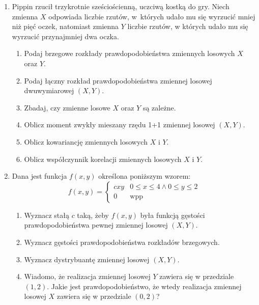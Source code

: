 \documentclass[twoside]{mwart}
\newcommand{\ans}[1]{}
\newenvironment{ansenv}{\comment}{\endcomment}
\newenvironment{ansenv}{\paragraph{Odpowiedź:}}{}
\newcommand{\ans}[1]{\begin{ansenv}#1\end{ansenv}}
\begin{document}
\begin{enumerate}
\item Pippin rzucił trzykrotnie sześciościenną, uczciwą kostką do gry. Niech zmienna $X$ odpowiada liczbie rzutów, w~których udało mu się wyrzucić mniej niż pięć
oczek, natomiast zmienna $Y$ liczbie rzutów, w których udało mu się wyrzucić przynajmniej dwa oczka.
\begin{enumerate}
\item Podaj brzegowe rozkłady prawdopodobieństwa zmiennych losowych $X$ oraz $Y$.
\item Podaj łączny rozkład prawdopodobieństwa zmiennej losowej dwuwymiarowej $(X,Y)$.
\item Zbadaj, czy zmienne losowe $X$ oraz $Y$ są zależne.
\item Oblicz moment zwykły mieszany rzędu 1+1 zmiennej losowej $(X,Y)$.
\item Oblicz kowariancję zmiennych losowych $X$ i $Y$.
\item Oblicz współczynnik korelacji zmiennych losowych $X$ i $Y$.
\end{enumerate}

\item Dana jest funkcja $f(x,y)$ określona poniższym wzorem:
\[ f(x,y)=\begin{cases} cxy & 0\leq x \leq 4 \land 0\leq y\leq 2 \\ 0 & \text{wpp}\end{cases} \]
\begin{enumerate}
\item Wyznacz stałą $c$ taką, żeby $f(x,y)$ była funkcją gęstości prawdopodobieństwa pewnej zmiennej losowej $(X,Y)$. \ans{$c=\frac{1}{16}$}
\item Wyznacz gęstości prawdopodobieństwa rozkładów brzegowych. \ans{$f_X(u)=\frac{u}{8} f_Y(v)=\frac{v}{2}$}
\item Wyznacz dystrybuantę zmiennej losowej $(X,Y)$. \ans{\[F(u,v)=\begin{cases}
	0 & u\leq 0 \lor v\leq 0 \\
	\frac{u^2v^2}{64} & 0<u\leq 4 \land 0<v\leq 2 \\
	\frac{u^2}{16} & 0<u\leq 4 \land v>2 \\
	\frac{v^2}{4} & u> 4 \land 0<v\leq 2 \\
	1 & u>4\land v>2
	\end{cases}\]}
\item Wiadomo, że realizacja zmiennej losowej $Y$ zawiera się w przedziale $(1,2)$. Jakie jest prawdopodobieństwo, że wtedy realizacja zmiennej losowej $X$ zawiera się w przedziale $(0,2)$?
\ans{$P(0<X<2|1<Y<2)=\frac{P(0<X<2,1<Y<2)}{P(1<Y<2)}=\frac{F(2,2)-F(2,1)-F(0,2)+F(0,1)}{F_Y(2)-F_Y(1)}=\frac{\frac{1}{4}-\frac{1}{16}-0+0}{1-\frac{1}{4}}=\frac{3}{16}\frac{4}{3}=\frac{1}{4}$}
\end{enumerate}
\end{enumerate}
\clearpage
\end{document}

